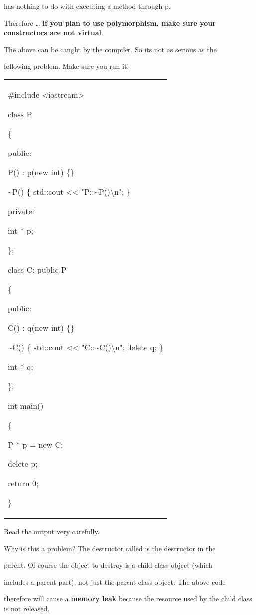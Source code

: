 \documentclass[
]{article}
\begin{document}
has nothing to do with executing a method through p.

Therefore \ldots{} \textbf{if you plan to use polymorphism, make sure
your constructors are not virtual}.

The above can be caught by the compiler. So it\textquotesingle s not as
serious as the

following problem. Make sure you run it!

\begin{longtable}[]{@{}
  >{\raggedright\arraybackslash}p{}@{}}
\toprule\noalign{}
 \\
\midrule\noalign{}
\endhead
\bottomrule\noalign{}
\endlastfoot
\#include \textless iostream\textgreater{}

class P

\{

public:

P() : p(new int) \{\}

\textasciitilde P() \{ std::cout \textless\textless{}
"P::\textasciitilde P()\textbackslash n"; \}

private:

int * p;

\};

class C: public P

\{

public:

C() : q(new int) \{\}

\textasciitilde C() \{ std::cout \textless\textless{}
"C::\textasciitilde C()\textbackslash n"; delete q; \}

int * q;

\};

int main()

\{

P * p = new C;

delete p;

return 0;

\} \\
\end{longtable}

Read the output very carefully.

Why is this a problem? The destructor called is the destructor in the

parent. Of course the object to destroy is a child class object (which

includes a parent part), not just the parent class object. The above
code

therefore will cause a \textbf{memory leak }because the resource used by
the child class is not released.
\end{document}

